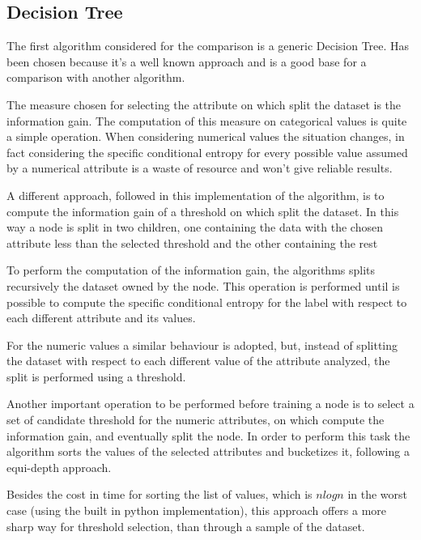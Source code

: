 \documentclass{acm_proc_article-sp-sigmod07}
\begin{document}
\subsection{Decision Tree}
The first algorithm considered for the comparison is a generic Decision
Tree. Has been chosen because it's a well known approach and is a good
base for a comparison with another algorithm.

The measure chosen for selecting the attribute on which split the dataset
is the information gain.
The computation of this measure on categorical values is quite a simple
operation. When considering numerical values the situation changes, in
fact considering the specific conditional entropy for every possible value
assumed by a numerical attribute is a waste of resource and won't give
reliable results.

A different approach, followed in this implementation of the algorithm, is
to compute the information gain of a threshold on which split the dataset.
In this way a node is split in two children, one containing the data with
the chosen attribute less than the selected threshold and the other
containing the rest 

To perform the computation of the information gain, the algorithms splits
recursively the dataset owned by the node. 
This operation is performed until is possible to compute the specific
conditional entropy for the label with respect to each different attribute
and its values.

For the numeric values a similar behaviour is adopted, but, instead of
splitting the dataset with respect to each different value of the
attribute analyzed, the split is performed using a threshold.

Another important operation to be performed before training a node is to
select a set of candidate threshold for the numeric attributes, on which
compute the information gain, and eventually split the node.
In order to perform this task the algorithm sorts the values of the
selected attributes and bucketizes it, following a equi-depth approach.

Besides the cost in time for sorting the list of values, which is $n log
n$ in the worst case (using the built in python implementation), this
approach offers a more sharp way for threshold selection, than through a
sample of the dataset.
\end{document}
